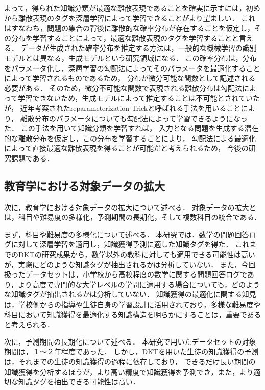よって，得られた知識分類が最適な離散表現であることを確実に示すには，初めから離散表現のタグを深層学習によって学習できることがより望ましい．
これはすなわち，問題の集合の背後に離散的な確率分布が存在することを仮定し，その分布を学習することによって，最適な離散表現のタグを学習することと言える．
データが生成された確率分布を推定する方法は，一般的な機械学習の識別モデルとは異なる，生成モデルという研究領域になる\cite{??}．
この確率分布は，分布をパラメータ化し，深層学習の勾配法によってそのパラメータを最適化することによって学習されるものであるため，
分布が微分可能な関数として記述される必要がある．
そのため，微分不可能な関数で表現される離散分布は勾配法によって学習できないため，生成モデルによって推定することは不可能とされていたが，
近年考案されたreparameterization Trick\cite{}と呼ばれる手法を用いることにより，
離散分布のパラメータについても勾配法によって学習できるようになった．
この手法を用いて知識分類を学習すれば，
入力となる問題を生成する潜在的な離散分布を仮定し，この分布を学習することにより，
勾配法による最適化によって直接最適な離散表現を得ることが可能だと考えられるため，
今後の研究課題である．




\subsection{教育学における対象データの拡大}
次に，教育学における対象データの拡大について述べる．
対象データの拡大とは，科目や難易度の多様化，予測期間の長期化，そして複数科目の統合である．


まず，科目や難易度の多様化について述べる．
本研究では．数学の問題回答ログに対して深層学習を適用し，知識獲得予測に適した知識タグを得た．
これまでのDKTの研究成果から，数学以外の教科に対しても適用できる可能性は高いが，実際にどのような知識タグが抽出されるかは分析していない．
また，今回扱ったデータセットは，小学校から高校程度の数学に関する問題回答ログであり，より高度で専門的な大学レベルの学問に適用する場合についても，どのような知識タグが抽出されるかは分析していない．
知識獲得の最適化に関する知見は，学校側からの指導や生徒自身の学習設計に活用されており，多様な難易度や科目において知識獲得を最適化する知識構造を明らかにすることは，重要であると考えられる．


次に，予測期間の長期化について述べる．
本研究で用いたデータセットの対象期間は，１〜２年程度であった．
しかし，DKTを用いた生徒の知識獲得の予測は，それまでの生徒の知識獲得の過程に依存しており，
できるだけ長い期間の知識獲得を分析するほうが，より高い精度で知識獲得を予測でき，また，より適切な知識タグを抽出できる可能性は高い．


